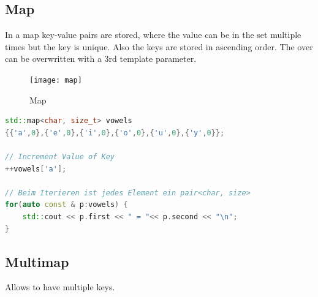 \subsection{Map}
In a map key-value pairs are stored, where the value can be in the set multiple times but the key is unique. Also the keys are stored in ascending order. The over can be overwritten with a 3rd template parameter.
\begin{figure}[h!]
  \centering
  \texttt{[image: map]}
  \caption{Map}
\end{figure}
\begin{lstlisting}[language=C++]
std::map<char, size_t> vowels
{{'a',0},{'e',0},{'i',0},{'o',0},{'u',0},{'y',0}};

// Increment Value of Key
++vowels['a'];

// Beim Iterieren ist jedes Element ein pair<char, size>
for(auto const & p:vowels) {
	std::cout << p.first << " = "<< p.second << "\n";
}
\end{lstlisting}

\subsection{Multimap}
Allows to have multiple keys.

